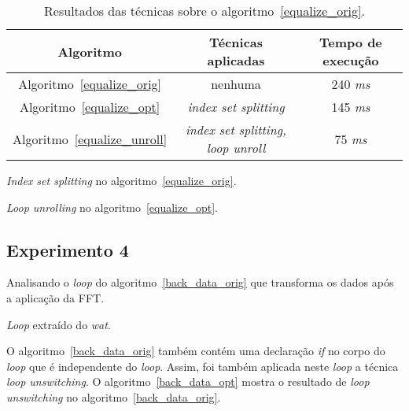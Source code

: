 \begin{table}[htp]
  \label{tabela_equalize}
\begin{center}
  \begin{tabular}{|c|c|c|}
    \hline
    \textbf{Algoritmo} & \textbf{Técnicas aplicadas} & \textbf{Tempo de execução}\\
    \hline
    Algoritmo~\ref{equalize_orig} & nenhuma & 240 \textit{ms} \\
    \hline
    Algoritmo~\ref{equalize_opt} & \textit{index set splitting} & 145 \textit{ms} \\
    \hline
    Algoritmo~\ref{equalize_unroll} & \textit{index set splitting, loop unroll}
                                    & 75 \textit{ms} \\
    \hline
  \end{tabular}
  \caption{Resultados das técnicas sobre o algoritmo~\ref{equalize_orig}.}
\end{center}
\end{table}



\begin{algorithm}[H]
  \caption{\textit{Index set splitting} no algoritmo~\ref{equalize_orig}.}
\label{equalize_opt}

\end{algorithm}

\begin{algorithm}[H]
  \caption{\textit{Loop unrolling} no algoritmo~\ref{equalize_opt}.}
\label{equalize_unroll}

\end{algorithm}

\newpage
\subsection{Experimento 4}

Analisando o \textit{loop} do algoritmo~\ref{back_data_orig} que transforma os 
dados após a aplicação da FFT.

\begin{algorithm}[H]
  \caption{\textit{Loop} extraído do \textit{wat}.}
\label{back_data_orig}

\end{algorithm}

O algoritmo~\ref{back_data_orig} também contém uma declaração \textit{if} no corpo do
\textit{loop} que é independente do \textit{loop}. Assim, foi também
aplicada neste \textit{loop} a técnica \textit{loop unswitching}.
O algoritmo~\ref{back_data_opt} mostra o resultado de \textit{loop unswitching} no
algoritmo~\ref{back_data_orig}.


